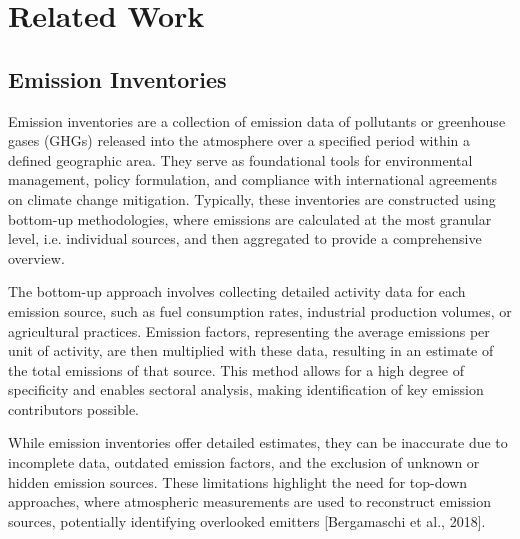 
\chapter{Related Work}\label{chapter:related_work}

\section{Emission Inventories}
Emission inventories are a collection of emission data of pollutants or greenhouse gases (GHGs) released into the atmosphere over a specified period within a defined geographic area.
They serve as foundational tools for environmental management, policy formulation, and compliance with international agreements on climate change mitigation.
Typically, these inventories are constructed using bottom-up methodologies, where emissions are calculated at the most granular level, i.e. individual sources, and then aggregated to provide a comprehensive overview.

The bottom-up approach involves collecting detailed activity data for each emission source, such as fuel consumption rates, industrial production volumes, or agricultural practices.
Emission factors, representing the average emissions per unit of activity, are then multiplied with these data, resulting in an estimate of the total emissions of that source.
This method allows for a high degree of specificity and enables sectoral analysis, making identification of key emission contributors possible.

While emission inventories offer detailed estimates, they can be inaccurate due to incomplete data, outdated emission factors, and the exclusion of unknown or hidden emission sources.
These limitations highlight the need for top-down approaches, where atmospheric measurements are used to reconstruct emission sources, potentially identifying overlooked emitters [Bergamaschi et al., 2018].




